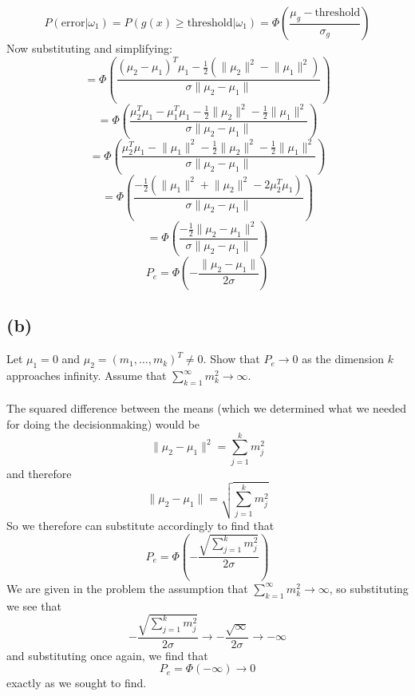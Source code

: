 \documentclass{article}
\begin{document}
{\[
  P(\text{error} | \omega_1) = P(g(x) \geq \text{threshold} | \omega_1) = \Phi(\frac{\mu_g - \text{threshold}}{\sigma_g})
\]
Now substituting and simplifying:
\[
  = \Phi(\frac{(\mu_2 - \mu_1)^T\mu_1 - \frac{1}{2}(\lVert \mu_2 \rVert^2 - \lVert \mu_1 \rVert^2)}{\sigma \lVert \mu_2 - \mu_1 \rVert})
\]
\[
  = \Phi(\frac{\mu_2^T\mu_1 - \mu_1^T\mu_1 - \frac{1}{2}\lVert \mu_2 \rVert^2 - \frac{1}{2}\lVert \mu_1 \rVert^2}{\sigma \lVert \mu_2 - \mu_1 \rVert})
\]
\[
  = \Phi(\frac{\mu_2^T\mu_1 - \lVert \mu_1 \rVert^2 - \frac{1}{2}\lVert \mu_2 \rVert^2 - \frac{1}{2}\lVert \mu_1 \rVert^2}{\sigma \lVert \mu_2 - \mu_1 \rVert})
\]
\[
  = \Phi(\frac{ -\frac{1}{2}(\lVert \mu_1 \rVert^2 + \lVert \mu_2 \rVert^2 - 2\mu_2^T\mu_1)}{\sigma \lVert \mu_2 - \mu_1 \rVert})
\]
\[
  = \Phi(\frac{ -\frac{1}{2}\lVert \mu_2 - \mu_1 \rVert^2}{\sigma \lVert \mu_2 - \mu_1 \rVert})
\]
\[
  \boxed{P_e = \Phi(-\frac{\lVert \mu_2 - \mu_1 \rVert}{2\sigma})}
\]

\subsection*{(b)}
Let \(\mu_1 = 0\) and \(\mu_2 = (m_1, \dots, m_k)^T \neq 0\). Show that \(P_e \to 0\) as the dimension \(k\) approaches infinity. Assume that \(\sum_{k=1}^{\infty} m^2_k \to \infty\). \\ \\
The squared difference between the means (which we determined what we needed for doing the decisionmaking) would be 
\[
  \lVert \mu_2 - \mu_1 \rVert^2 = \sum_{j=1}^{k} m^2_j
\]
and therefore 
\[
  \lVert \mu_2 - \mu_1 \rVert = \sqrt{\sum_{j=1}^{k} m^2_j}
\]
So we therefore can substitute accordingly to find that 
\[
  P_e = \Phi(-\frac{\sqrt{\sum_{j=1}^{k} m^2_j}}{2\sigma})
\]
We are given in the problem the assumption that \(\sum_{k=1}^{\infty} m^2_k \to \infty\), so substituting we see that  
\[
  -\frac{\sqrt{\sum_{j=1}^{k} m^2_j}}{2\sigma} \to -\frac{\sqrt{\infty}}{2\sigma} \to -\infty
\]
and substituting once again, we find that 
\[
  P_e = \Phi(-\infty) \to 0
\]
exactly as we sought to find.

}
\end{document}
